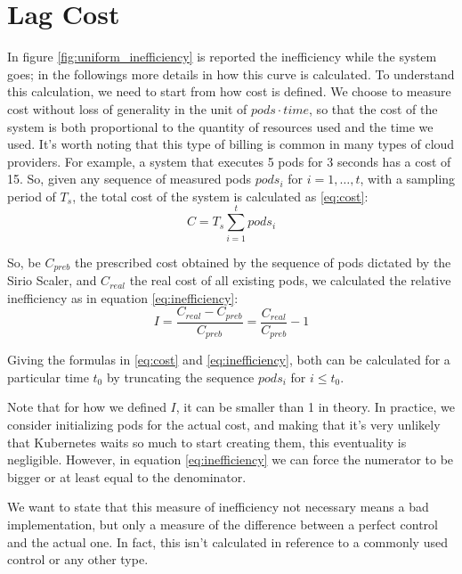 \section{Lag Cost}
\label{sec:lag_cost}
In figure \ref{fig:uniform_inefficiency} is reported the inefficiency while the system goes; in the followings more details in how this curve is calculated. To understand this calculation, we need to start from how cost is defined. We choose to measure cost without loss of generality in the unit of $pods \cdot time$, so that the cost of the system is both proportional to the quantity of resources used and the time we used. It's worth noting that this type of billing is common in many types of cloud providers. For example, a system that executes 5 pods for 3 seconds has a cost of 15. So, given any sequence of measured pods $pods_i$ for $i=1,\dots,t$, with a sampling period of $T_s$, the total cost of the system is calculated as \ref{eq:cost}:
\begin{equation}
    \label{eq:cost}
    C = T_s\sum_{i=1}^{t}pods_i
\end{equation}

So, be $C_{preb}$ the prescribed cost obtained by the sequence of pods dictated by the Sirio Scaler, and $C_{real}$ the real cost of all existing pods, we calculated the relative inefficiency as in equation \ref{eq:inefficiency}:
\begin{equation}
    \label{eq:inefficiency}
    I =\frac{C_{real} - C_{preb}}{C_{preb}} = \frac{C_{real}}{C_{preb}} - 1
\end{equation}

Giving the formulas in \ref{eq:cost} and \ref{eq:inefficiency}, both can be calculated for a particular time $t_0$ by truncating the sequence $pods_i$ for $i\leq t_0$.

Note that for how we defined $I$, it can be smaller than 1 in theory. In practice, we consider initializing pods for the actual cost, and making that it's very unlikely that Kubernetes waits so much to start creating them, this eventuality is negligible. However, in equation \ref{eq:inefficiency} we can force the numerator to be bigger or at least equal to the denominator.

We want to state that this measure of inefficiency not necessary means a bad implementation, but only a measure of the difference between a perfect control and the actual one. In fact, this isn't calculated in reference to a commonly used control or any other type.